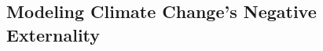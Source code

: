 \documentclass[aspectratio=1610]{beamer}
\begin{document}

\subsection*{Modeling Climate Change's Negative Externality}
\label{sec:climate_econ}


\end{document}

